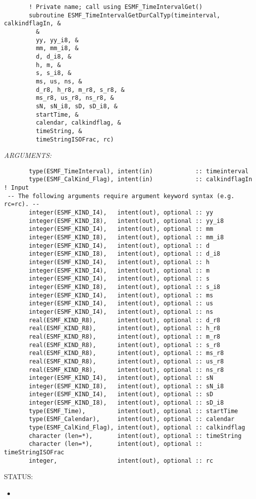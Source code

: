  
\begin{verbatim}       ! Private name; call using ESMF_TimeIntervalGet()
       subroutine ESMF_TimeIntervalGetDurCalTyp(timeinterval, calkindflagIn, &
         &
         yy, yy_i8, &
         mm, mm_i8, &
         d, d_i8, &
         h, m, &
         s, s_i8, &
         ms, us, ns, &
         d_r8, h_r8, m_r8, s_r8, &
         ms_r8, us_r8, ns_r8, &
         sN, sN_i8, sD, sD_i8, &
         startTime, &
         calendar, calkindflag, &
         timeString, &
         timeStringISOFrac, rc)
 \end{verbatim}{\em ARGUMENTS:}
\begin{verbatim}       type(ESMF_TimeInterval), intent(in)            :: timeinterval
       type(ESMF_CalKind_Flag), intent(in)            :: calkindflagIn ! Input
 -- The following arguments require argument keyword syntax (e.g. rc=rc). --
       integer(ESMF_KIND_I4),   intent(out), optional :: yy
       integer(ESMF_KIND_I8),   intent(out), optional :: yy_i8
       integer(ESMF_KIND_I4),   intent(out), optional :: mm
       integer(ESMF_KIND_I8),   intent(out), optional :: mm_i8
       integer(ESMF_KIND_I4),   intent(out), optional :: d
       integer(ESMF_KIND_I8),   intent(out), optional :: d_i8
       integer(ESMF_KIND_I4),   intent(out), optional :: h
       integer(ESMF_KIND_I4),   intent(out), optional :: m
       integer(ESMF_KIND_I4),   intent(out), optional :: s
       integer(ESMF_KIND_I8),   intent(out), optional :: s_i8
       integer(ESMF_KIND_I4),   intent(out), optional :: ms
       integer(ESMF_KIND_I4),   intent(out), optional :: us
       integer(ESMF_KIND_I4),   intent(out), optional :: ns
       real(ESMF_KIND_R8),      intent(out), optional :: d_r8
       real(ESMF_KIND_R8),      intent(out), optional :: h_r8
       real(ESMF_KIND_R8),      intent(out), optional :: m_r8
       real(ESMF_KIND_R8),      intent(out), optional :: s_r8
       real(ESMF_KIND_R8),      intent(out), optional :: ms_r8
       real(ESMF_KIND_R8),      intent(out), optional :: us_r8
       real(ESMF_KIND_R8),      intent(out), optional :: ns_r8
       integer(ESMF_KIND_I4),   intent(out), optional :: sN
       integer(ESMF_KIND_I8),   intent(out), optional :: sN_i8
       integer(ESMF_KIND_I4),   intent(out), optional :: sD
       integer(ESMF_KIND_I8),   intent(out), optional :: sD_i8
       type(ESMF_Time),         intent(out), optional :: startTime
       type(ESMF_Calendar),     intent(out), optional :: calendar
       type(ESMF_CalKind_Flag), intent(out), optional :: calkindflag
       character (len=*),       intent(out), optional :: timeString
       character (len=*),       intent(out), optional :: timeStringISOFrac
       integer,                 intent(out), optional :: rc
 \end{verbatim}
{\sf STATUS:}
   \begin{itemize}
   \item{}
   \end{itemize}
  
